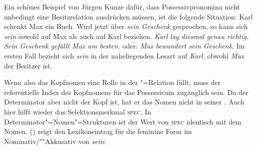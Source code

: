 Ein schönes Beispiel von Jürgen Kunze dafür, 
dass Possessivpronomina nicht unbedingt eine Besitzrelation ausdrücken müssen,
ist die folgende Situation: Karl schenkt Max ein Buch.
Wird jetzt über \emph{sein Geschenk} gesprochen, so kann sich \emph{sein} sowohl auf
Max als auch auf Karl beziehen. \emph{Karl lag diesmal genau richtig. Sein Geschenk
gefällt Max am besten.} oder: \emph{Max bewundert sein Geschenk}.
Im ersten Fall bezieht sich \emph{sein} in der naheliegenden Lesart
auf \emph{Karl}, obwohl \emph{Max} der Besitzer ist.

Wenn also das Kopfnomen eine Rolle in der "=Relation füllt, muss der
referentielle Index des Kopfnomens für das Possessivum zugänglich sein. Da der Determinator
aber nicht der Kopf ist, hat er das Nomen nicht in seiner \subcatl. Auch hier hilft
wieder das Selektionsmerkmal \textsc{spec}. In Determinator"=Nomen"=Strukturen
ist der Wert von \textsc{spec} identisch mit dem Nomen. () zeigt den Lexikoneintrag
für die feminine Form im Nominativ/""Akkusativ von \emph{sein}:


